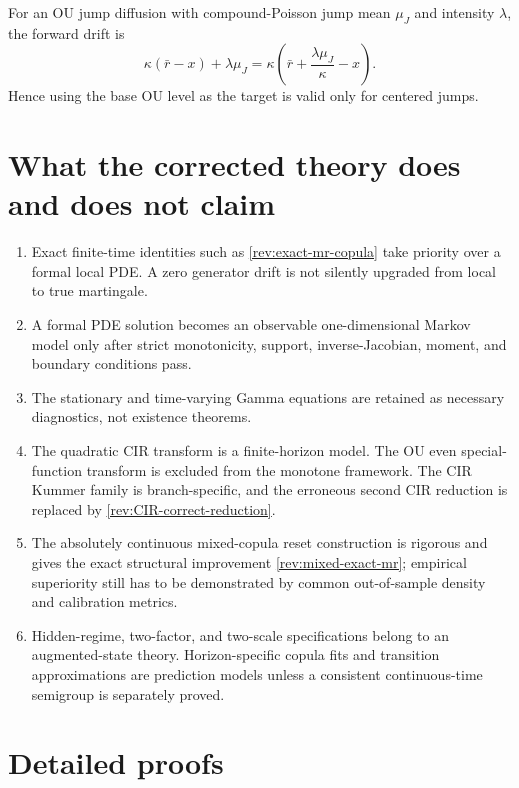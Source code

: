 \documentclass[11pt]{article}
\theoremstyle{remark}
\begin{document}
For an OU jump diffusion with compound-Poisson jump mean $\mu_J$ and intensity
$\lambda$, the forward drift is
\begin{equation}
\kappa(\bar r-x)+\lambda\mu_J
=\kappa\left(\bar r+\frac{\lambda\mu_J}{\kappa}-x\right).
\label{rev:jump-OU-target}
\end{equation}
Hence using the base OU level as the target is valid only for centered jumps.

\section{What the corrected theory does and does not claim}

\begin{enumerate}[label=(\roman*)]
\item Exact finite-time identities such as \eqref{rev:exact-mr-copula} take
priority over a formal local PDE.  A zero generator drift is not silently
upgraded from local to true martingale.
\item A formal PDE solution becomes an observable one-dimensional Markov model
only after strict monotonicity, support, inverse-Jacobian, moment, and boundary
conditions pass.
\item The stationary and time-varying Gamma equations are retained as necessary
diagnostics, not existence theorems.
\item The quadratic CIR transform is a finite-horizon model.  The OU even
special-function transform is excluded from the monotone framework.  The CIR
Kummer family is branch-specific, and the erroneous second CIR reduction is
replaced by \eqref{rev:CIR-correct-reduction}.
\item The absolutely continuous mixed-copula reset construction is rigorous and gives the exact
structural improvement \eqref{rev:mixed-exact-mr}; empirical superiority still
has to be demonstrated by common out-of-sample density and calibration metrics.
\item Hidden-regime, two-factor, and two-scale specifications belong to an
augmented-state theory.  Horizon-specific copula fits and transition
approximations are prediction models unless a consistent continuous-time
semigroup is separately proved.
\end{enumerate}

\clearpage
\appendix
\section{Detailed proofs}
\label{rev:sec-detailed-proofs}
\end{document}
